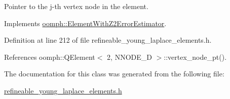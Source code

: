 Pointer to the j-\/th vertex node in the element. 



Implements \hyperlink{classoomph_1_1ElementWithZ2ErrorEstimator_a0eedccc33519f852c5dc2055ddf2774b}{oomph\+::\+Element\+With\+Z2\+Error\+Estimator}.



Definition at line 212 of file refineable\+\_\+young\+\_\+laplace\+\_\+elements.\+h.



References oomph\+::\+Q\+Element$<$ 2, N\+N\+O\+D\+E\+\_\+D $>$\+::vertex\+\_\+node\+\_\+pt().



The documentation for this class was generated from the following file\+:\begin{DoxyCompactItemize}
\item 
\hyperlink{refineable__young__laplace__elements_8h}{refineable\+\_\+young\+\_\+laplace\+\_\+elements.\+h}\end{DoxyCompactItemize}
